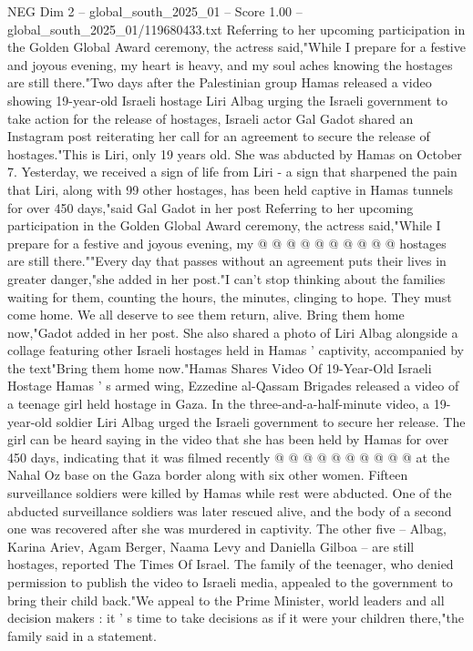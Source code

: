 \begin{textsample}{NEG Dim 2 – global\_south\_2025\_01 – Score 1.00 – global\_south\_2025\_01/119680433.txt}  \label{ex:f2_neg_129}
Referring to her upcoming participation in the Golden Global Award ceremony, the actress said,"While I prepare for a festive and joyous evening, my heart is heavy, and my soul aches knowing the hostages are still there."Two days after the Palestinian group Hamas released a video showing 19-year-old Israeli hostage Liri Albag urging the Israeli government to take action for the release of hostages, Israeli actor Gal Gadot shared an Instagram post reiterating her call for an agreement to secure the release of hostages."This is Liri, only 19 years old.
She was abducted by Hamas on October 7.
Yesterday, we received a sign of life from Liri - a sign that sharpened the pain that Liri, along with 99 other hostages, has been held captive in Hamas tunnels for over 450 days,"said Gal Gadot in her post Referring to her upcoming participation in the Golden Global Award ceremony, the actress said,"While I prepare for a festive and joyous evening, my @ @ @ @ @ @ @ @ @ @ hostages are still there.""Every day that passes without an agreement puts their lives in greater danger,"she added in her post."I can't stop thinking about the families waiting for them, counting the hours, the minutes, clinging to hope.
They must come home.
We all deserve to see them return, alive.
Bring them home now,"Gadot added in her post.
She also shared a photo of Liri Albag alongside a collage featuring other Israeli hostages held in Hamas ' captivity, accompanied by the text"Bring them home now."Hamas Shares Video Of 19-Year-Old Israeli Hostage Hamas ' s armed wing, Ezzedine al-Qassam Brigades released a video of a teenage girl held hostage in Gaza.
In the three-and-a-half-minute video, a 19-year-old soldier Liri Albag urged the Israeli government to secure her release.
The girl can be heard saying in the video that she has been held by Hamas for over 450 days, indicating that it was filmed recently @ @ @ @ @ @ @ @ @ @ at the Nahal Oz base on the Gaza border along with six other women.
Fifteen surveillance soldiers were killed by Hamas while rest were abducted.
One of the abducted surveillance soldiers was later rescued alive, and the body of a second one was recovered after she was murdered in captivity.
The other five -- Albag, Karina Ariev, Agam Berger, Naama Levy and Daniella Gilboa -- are still hostages, reported The Times Of Israel.
The family of the teenager, who denied permission to publish the video to Israeli media, appealed to the government to bring their child back."We appeal to the Prime Minister, world leaders and all decision makers : it ' s time to take decisions as if it were your children there,"the family said in a statement.

\end{textsample}

